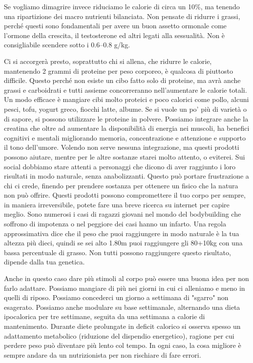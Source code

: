 \documentclass[12pt]{book} %
\begin{document}
Se vogliamo dimagrire invece riduciamo le calorie di circa un 10\%, ma tenendo una ripartizione dei macro nutrienti bilanciata. Non pensate di ridurre i grassi, perché questi sono fondamentali per avere un buon assetto ormonale come l'ormone della crescita, il testosterone ed altri legati alla sessualità. Non è consigliabile scendere sotto i 0.6–0.8 g/kg.

Ci si accorgerà presto, soprattutto chi si allena, che ridurre le calorie, mantenendo 2 grammi di proteine per peso corporeo, è qualcosa di piuttosto difficile. Questo perché non esiste un cibo fatto solo di proteine, ma avrà anche grassi e carboidrati e tutti assieme concorreranno nell'aumentare le calorie totali. Un modo efficace è mangiare cibi molto proteici e poco calorici come pollo, alcuni pesci, tofu, yogurt greco, fiocchi latte, albume. Se si vuole un po' più di varietà o di sapore, si possono utilizzare le proteine in polvere. Possiamo integrare anche la creatina che oltre ad aumentare la disponibilità di energia nei muscoli, ha benefici cognitivi e mentali migliorando memoria, concentrazione e attenzione e supporto il tono dell’umore.
Volendo non serve nessuna integrazione, ma questi prodotti possono aiutare, mentre per le altre sostanze starei molto attento, o eviterei. Sui social dobbiamo stare attenti a personaggi che dicono di aver raggiunto i loro risultati in modo naturale, senza anabolizzanti. Questo può portare frustrazione a chi ci crede, finendo per prendere sostanza per ottenere un fisico che la natura non può offrire. Questi prodotti possono compromettere il tuo corpo per sempre, in maniera irreversibile, potete fare una breve ricerca su internet per capire meglio. Sono numerosi i casi di ragazzi giovani nel mondo del bodybuilding che soffrono di impotenza o nel peggiore dei casi hanno un infarto. Una regola approssimativa dice che il peso che puoi raggiungere in modo naturale è la tua altezza più dieci, quindi se sei alto 1.80m puoi raggiungere gli 80+10kg con una bassa percentuale di grasso. Non tutti possono raggiungere questo risultato, dipende dalla tua genetica.

Anche in questo caso dare più stimoli al corpo può essere una buona idea per non farlo adattare. Possiamo mangiare di più nei giorni in cui ci alleniamo e meno in quelli di riposo. Possiamo concederci un giorno a settimana di "sgarro" non esagerato. Possiamo anche modulare su base settimanale, alternando una dieta ipocalorica per tre settimane, seguita da una settimana a calorie di mantenimento. Durante diete prolungate in deficit calorico si osserva spesso un adattamento metabolico (riduzione del dispendio energetico), ragione per cui perdere peso può diventare più lento col tempo. In ogni caso, la cosa migliore è sempre andare da un nutrizionista per non rischiare di fare errori.
\end{document}
